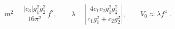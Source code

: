 \begin{equation}
m^2 = \frac{|c_3| g_1^2 g_2^2}{16\pi^2}\, f^2, \qquad \lambda=
\left|\frac{4 c_1 c_2 g_1^2 g_2^2}{c_1 g_1^2+ c_2 g_2^2}\right|, \qquad
V_0 \approx \lambda f^4 \;.
\end{equation}

